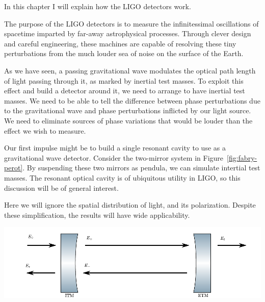 \label{chapter2}

In this chapter I will explain how the LIGO detectors work.


The purpose of the LIGO detectors is to measure the infinitessimal
oscillations of spacetime imparted by far-away astrophysical
processes.  Through clever design and careful engineering, these
machines are capable of resolving these tiny perturbations from the
much louder sea of noise on the surface of the Earth.  \the\columnwidth

As we have seen, a passing gravitational wave modulates the optical
path length of light passing through it, as marked by inertial test
masses.  To exploit this effect and build a detector around it, we
need to arrange to have inertial test masses.  We need to be able to
tell the difference between phase perturbations due to the
gravitational wave and phase perturbations inflicted by our light
source.  We need to eliminate sources of phase variations that would
be louder than the effect we wish to measure.  


Our first impulse might be to build a single resonant cavity to use as
a gravitational wave detector.  Consider the two-mirror system in
Figure~\ref{fig:fabry-perot}.  By suspending these two mirrors as
pendula, we can simulate intertial test masses.  The resonant optical
cavity is of ubiquitous utility in LIGO, so this discussion will be of
general interest.

Here we will ignore the spatial distribution of light, and its
polarization.  Despite these simplification, the results will have
wide applicability.

\includegraphics[]{figures/cavity.pdf}

